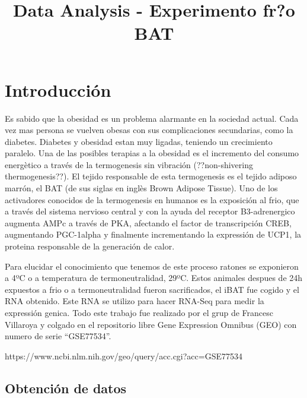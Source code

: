 \documentclass[11pt]{article}
\title{Data Analysis - Experimento fr?o BAT}
\begin{document}
    
    
    \maketitle
    
    

    
    \section{Introducción}\label{introducciuxf3n}

Es sabido que la obesidad es un problema alarmante en la sociedad
actual. Cada vez mas persona se vuelven obesas con sus complicaciones
secundarias, como la diabetes. Diabetes y obesidad estan muy ligadas,
teniendo un crecimiento paralelo. Una de las posibles terapias a la
obesidad es el incremento del consumo energètico a través de la
termogenesis sin vibración (??non-shivering thermogenesis??). El tejido
responsable de esta termogenesis es el tejido adiposo marrón, el BAT (de
sus siglas en inglès Brown Adipose Tissue). Uno de los activadores
conocidos de la termogenesis en humanos es la exposición al frio, que a
través del sistema nervioso central y con la ayuda del receptor
B3-adrenergico augmenta AMPc a través de PKA, afectando el factor de
transcripción CREB, augmentando PGC-1alpha y finalmente incrementando la
expressión de UCP1, la proteina responsable de la generación de calor.

Para elucidar el conocimiento que tenemos de este proceso ratones se
exponieron a 4ºC o a temperatura de termoneutralidad, 29ºC. Estos
animales despues de 24h expuestos a frio o a termoneutralidad fueron
sacrificados, el iBAT fue cogido y el RNA obtenido. Este RNA se utilizo
para hacer RNA-Seq para medir la expressión genica. Todo este trabajo
fue realizado por el grup de Francesc Villaroya y colgado en el
repositorio libre Gene Expression Omnibus (GEO) con numero de serie
``GSE77534''.

https://www.ncbi.nlm.nih.gov/geo/query/acc.cgi?acc=GSE77534

    \subsection{Obtención de datos}\label{obtenciuxf3n-de-datos}
\end{document}

